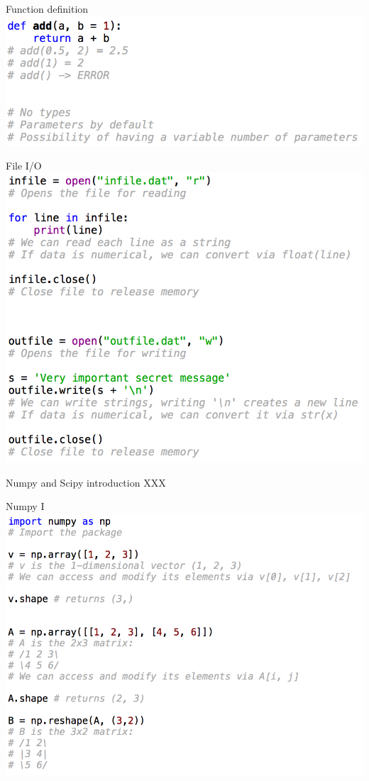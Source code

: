 \documentclass[11pt,unknownkeysallowed,usenames,dvipsnames]{beamer}
\begin{document}
%    
\begin{frame}{Function definition}
    \includegraphics[width=\linewidth]{code-functions}
\end{frame}
   

\begin{frame}{File I/O}
	\includegraphics[width=0.8\linewidth]{code-fileio}
\end{frame}


\begin{frame}{Numpy and Scipy introduction}
	XXX
\end{frame}

\begin{frame}{Numpy I}
\includegraphics[width=0.9\linewidth]{code-numpy1}
\end{frame}
\end{document}
